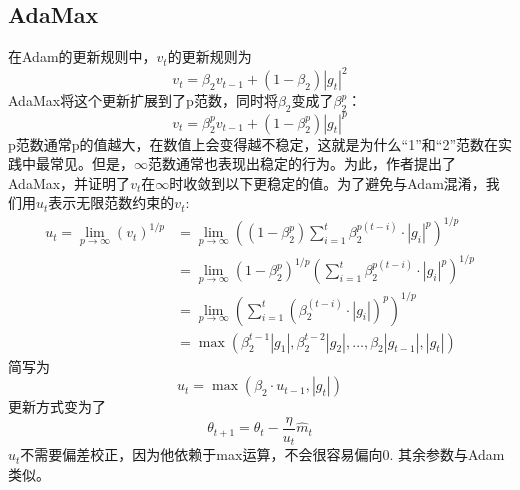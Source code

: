 \documentclass[10.5pt,a4paper]{article}%
\begin{document}
        \subsection{AdaMax}
            在Adam的更新规则中，$v_t$的更新规则为
            $$v_t=\beta_2v_{t-1}+(1-\beta_2)|g_t|^2$$
            AdaMax\cite{adam}将这个更新扩展到了p范数，同时将$\beta_2\text{变成了}\beta_2^p$：
            $$v_t=\beta_2^p v_{t-1}+(1-\beta_2^p)|g_t|^p$$
            p范数通常p的值越大，在数值上会变得越不稳定，这就是为什么“1”和“2”范数在实践中最常见。但是，$∞$范数通常也表现出稳定的行为。为此，作者提出了AdaMax，并证明了$v_t$在$∞$时收敛到以下更稳定的值。为了避免与Adam混淆，我们用$u_t$表示无限范数约束的$v_t$:  
            \begin{align*}u_t=\lim_{p\to\infty}(v_t)^{1/p}&=\lim_{p\to\infty}\left((1-\beta_2^p)\sum_{i=1}^t\beta_2^{p(t-i)}\cdot|g_i|^p\right)^{1/p}\\ &=\lim_{p\to\infty}(1-\beta_2^{p})^{1/p}\left(\sum_{i=1}^t\beta_2^{p(t-i)}\cdot|g_i|^p\right)^{1/p}\\&=\lim_{p\to\infty}\left(\sum_{i=1}^t\left(\beta_2^{(t-i)}\cdot|g_i|\right)^p\right)^{1/p}\\ &=\max\left(\beta_2^{t-1}|g_1|,\beta_2^{t-2}|g_2|,\ldots,\beta_2|g_{t-1}|,|g_t|\right)\end{align*}
            简写为
            $$u_t=\max(\beta_2\cdot u_{t-1},|g_t|)$$
            更新方式变为了
            $$\theta_{t+1}=\theta_t-\dfrac{\eta}{u_t}\hat{m}_t$$
            $u_t$不需要偏差校正，因为他依赖于max运算，不会很容易偏向0. 其余参数与Adam类似。
\end{document}
